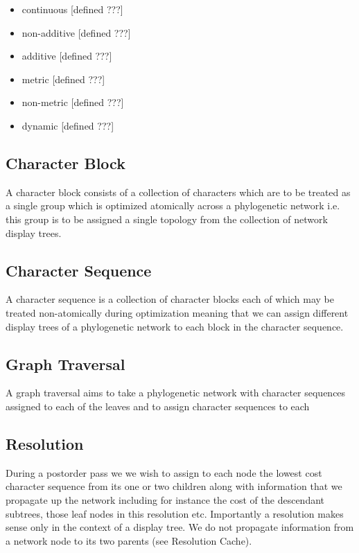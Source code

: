 \documentclass[11pt]{article}
\begin{document}
\begin{itemize}

	\item continuous [defined ???]
	\item non-additive [defined ???]
	\item additive [defined ???]
	\item metric [defined ???]
	\item non-metric [defined ???]
	\item dynamic [defined ???]
	
\end{itemize}


\subsection{Character Block}

A character block consists of a collection of characters which are to be treated as a single group which is optimized atomically across a phylogenetic network i.e. this group is to be assigned a single topology from the collection of network display trees.

\subsection{Character Sequence}

A character sequence is a collection of character blocks each of which may be treated non-atomically during optimization meaning that we can assign different display trees of a phylogenetic network to each block in the character sequence.

\subsection{Graph Traversal}

A graph traversal aims to take a phylogenetic network with character sequences assigned to each of the leaves and to assign character sequences to each

\subsection{Resolution}

During a postorder pass we we wish to assign to each node the lowest cost character sequence from its one or two children along with information that we propagate up the network including for instance the cost of the descendant subtrees, those leaf nodes in this resolution etc. 
Importantly a resolution makes sense only in the context of a display tree. 
We do not propagate information from a network node to its two parents (see Resolution Cache).
\end{document}
